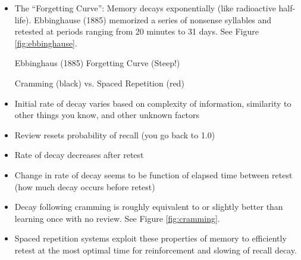 \documentclass[]{tufte-handout}
\begin{document}
\begin{itemize}
	\item The ``Forgetting Curve'': Memory decays exponentially (like radioactive half-life). Ebbinghause (1885) memorized a series of nonsense syllables and retested at periods ranging from 20 minutes to 31 days. See Figure \ref{fig:ebbinghause}.

\begin{marginfigure}%
  \caption{Ebbinghaus (1885) Forgetting Curve (Steep!)}
  \label{fig:ebbinghause}
\end{marginfigure}

\begin{marginfigure}%
  \caption{Cramming (black) vs. Spaced Repetition (red)}
  \label{fig:cramming}
\end{marginfigure}

	\item Initial rate of decay varies based on complexity of information, similarity to other things you know, and other unknown factors
	\item Review resets probability of recall (you go back to 1.0)
	\item Rate of decay decreases after retest
	\item Change in rate of decay seems to be function of elapsed time between retest (how much decay occurs before retest)
	\item Decay following cramming is roughly equivalent to or slightly better than learning once with no review. See Figure \ref{fig:cramming}.
	\item Spaced repetition systems exploit these properties of memory to efficiently retest at the most optimal time for reinforcement and slowing of recall decay.

\end{itemize}
\end{document}
